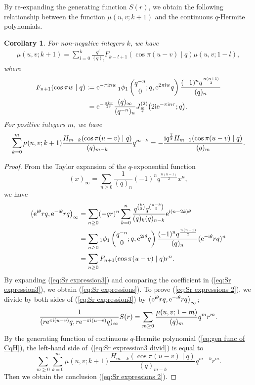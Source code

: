 \documentclass[pdftex]{sigma}
\numberwithin{equation}{section}
\newtheorem{cor}[thm]{Corollary}
\theoremstyle{definition}
\newcommand{\hyper}[4]{\left(\begin{matrix} #1 \\ #2 \end{matrix}; #3, #4\right)}
\begin{document}
By re-expanding the generating function $S(r)$, we obtain the following relationship between the function $\mu(u,v;k+1)$ and the continuous $q$-Hermite polynomials.
\begin{cor}\label{cor:Sr expressions}
For non-negative integers $k$, we have
\begin{gather}
\label{eq:Sr expressions}
\mu(u,v;k+1)
 =
 \sum_{l=0}^{k}
 \frac{q^{l}}{(q)_{l}}F_{k-l+1}(\cos\pi(u-v)\mid q)\mu (u,v;1-l),
\end{gather}
where
\begin{align*}
F_{n+1}(\cos\pi w\mid q)
 :={}&
 {\rm e}^{- \pi{\rm i}nw}\, {}_1\phi_1\hyper{q^{-n}}{0}{q}{{\rm e}^{2 \pi{\rm i}w}q}\frac{(-1)^nq^\frac{n(n+1)}{2}}{(q)_n}\\
={}&
 {\rm e}^{-\frac{\pi{\rm i}w}{2\tau}}\frac{(q)_\infty}{(q^{-n})_n} J_\frac{w}{\tau}^{(2)}\big(2{\rm i}{\rm e}^{-\pi{\rm i}n\tau};q\big).
\end{align*}
For positive integers $m$, we have
\begin{gather}
\label{eq:Sr expressions 2}
\sum_{k=0}^{m}\mu{(u,v;k+1)}\frac{H_{m-k}(\cos{\pi (u-v)}\mid q)}{(q)_{m-k}}q^{m-k}
 =
 -\frac{{\rm i}q^\frac{7}{8}H_{m-1}(\cos{\pi (u-v)}\mid q)}{(q)_{m}}.
\end{gather}
\end{cor}
\begin{proof}
From the Taylor expansion of the $q$-exponential function \cite[equation~(II.2)]{GR}
\[
(x)_{\infty }=\sum_{n\geq 0}\frac{1}{(q)_{n}}(-1)^nq^\frac{n(n-1)}{2}x^{n},
\]
we have
\begin{align*}
\big({\rm e}^{{\rm i}\theta }rq,{\rm e}^{-{\rm i}\theta }rq\big)_{\infty }
 &=
 \sum_{n\geq 0}(-qr)^{n}\sum_{k=0}^{n}\frac{q^{\binom{k}{2}}q^{\binom{n-k}{2}}}{(q )_{k}(q )_{n-k}}{\rm e}^{{\rm i}(n-2k)\theta }\\
 &=
 \sum_{n\geq 0}{}_1\phi_1\hyper{q^{-n}}{0}{q}{{\rm e}^{2{\rm i}\theta}q}\frac{(-1)^nq^\frac{n(n-1)}{2}}{(q)_n}({\rm e}^{-{\rm i}\theta}rq)^n\\
 &=
 \sum_{n\geq0}F_{n+1}(\cos\pi(u-v)\mid q)r^n.
\end{align*}
By expanding (\ref{eq:Sr expression3}) and comparing the coefficient in (\ref{eq:Sr expression3}), we obtain (\ref{eq:Sr expressions}).
To prove (\ref{eq:Sr expressions 2}), we divide by both sides of (\ref{eq:Sr expression3}) by $\big({\rm e}^{{\rm i}\theta }rq,{\rm e}^{-{\rm i}\theta }rq\big)_{\infty }$;
\begin{align}
\label{eq:Sr expression3 divid}
\frac{1}{(r{\rm e}^{\pi{\rm i}(u-v)}q,r{\rm e}^{-\pi{\rm i}(u-v)}q)_{\infty }}S(r)
 =
 \sum_{m\geq 0}\frac{\mu(u,v;1-m )}{(q)_{m}}q^{m}r^{m}.
\end{align}
By the generating function of continuous $q$-Hermite polynomial (\ref{eq:gen func of CqH}), the left-hand side of~(\ref{eq:Sr expression3 divid}) is equal to
\[
\sum_{m\geq 0}\sum_{k=0}^{m}\mu{(u,v;k+1)}\frac{H_{m-k}(\cos{\pi (u-v)}\mid q)}{(q)_{m-k}}q^{m-k}r^{m}.
\]
Then we obtain the conclusion (\ref{eq:Sr expressions 2}).
\end{proof}
\end{document}
